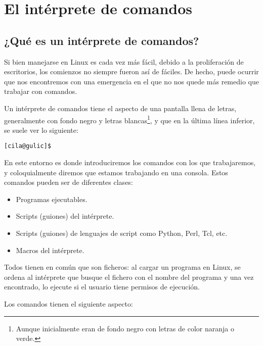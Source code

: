 
\chapter{El intérprete de comandos}
\label{comandos.tex}
\section{¿Qué es un intérprete de comandos?}

Si  bien  manejarse en  Linux  es  cada vez  más  fácil,  debido a  la
proliferación  de escritorios,  los  comienzos no  siempre fueron  así
de  fáciles. De  hecho,  puede  ocurrir que  nos  encontremos con  una
emergencia  en el  que  no  nos quede  más  remedio  que trabajar  con
comandos.

Un intérprete  de comandos tiene el  aspecto de una pantalla  llena de
letras, generalmente con fondo  negro y letras blancas\footnote{Aunque
inicialmente  eran  de fondo  negro  con  letras  de color  naranja  o
verde.}, y que en la última línea inferior, se suele ver lo siguiente:

\begin{verbatim}
[cila@gulic]$
\end{verbatim}

En  este entorno  es donde  introduciremos  los comandos  con los  que
trabajaremos, y  coloquialmente diremos que estamos  trabajando en una
consola. Estos comandos pueden ser de diferentes clases:

\begin{itemize}
\item Programas ejecutables.

\item Scripts (guiones) del intérprete.

\item Scripts (guiones) de lenguajes de  script como {\sf Python},  {\sf Perl},
{\sf Tcl}, etc.

\item Macros del intérprete.
\end{itemize}

Todos  tienen en  común que  son ficheros:  al cargar  un programa  en
Linux, se ordena al intérprete que busque el fichero con el nombre del
programa y una vez encontrado, lo ejecute si el usuario tiene permisos
de ejecución.

Los comandos tienen el siguiente aspecto:

